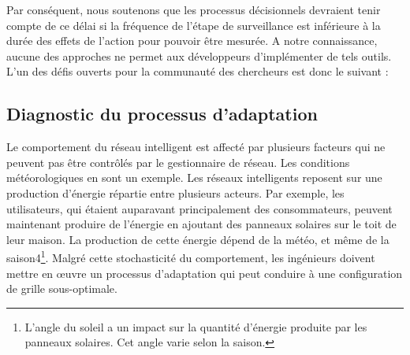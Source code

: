 Par conséquent, nous soutenons que les processus décisionnels devraient tenir compte de ce délai si la fréquence de l'étape de surveillance est inférieure à la durée des effets de l'action pour pouvoir être mesurée. 
A notre connaissance, aucune des approches ne permet aux développeurs d'implémenter de tels outils. 
L'un des défis ouverts pour la communauté des chercheurs est donc le suivant :
\vspace{-2em}

\subsection{Diagnostic du processus d'adaptation}

%
Le comportement du réseau intelligent est affecté par plusieurs facteurs qui ne peuvent pas être contrôlés par le gestionnaire de réseau. 
Les conditions météorologiques en sont un exemple. Les réseaux intelligents reposent sur une production d'énergie répartie entre plusieurs acteurs. 
Par exemple, les utilisateurs, qui étaient auparavant principalement des consommateurs, peuvent maintenant produire de l'énergie en ajoutant des panneaux solaires sur le toit de leur maison. 
La production de cette énergie dépend de la météo, et même de la saison4\footnote{L'angle du soleil a un impact sur la quantité d'énergie produite par les panneaux solaires. Cet angle varie selon la saison.}. 
Malgré cette stochasticité du comportement, les ingénieurs doivent mettre en œuvre un processus d'adaptation qui peut conduire à une configuration de grille sous-optimale.

